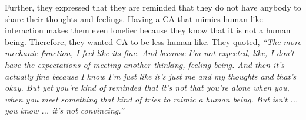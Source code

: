         Further, they expressed that they are reminded that they do not have anybody to share their thoughts and feelings. Having a \ac{CA} that mimics human-like interaction makes them even lonelier because they know that it is not a human being. Therefore, they wanted \ac{CA} to be less human-like. They quoted,
                \textit{``The more mechanic function, I feel like its fine. And because I'm not expected, like, I don't have the expectations of meeting another thinking, feeling being. And then it's actually fine because I know I'm just like it's just me and my thoughts and that's okay. But yet you're kind of reminded that it's not that you're alone when you, when you meet something that kind of tries to mimic a human being. But isn't ... you know ... it's not convincing.''
                }



            
            

